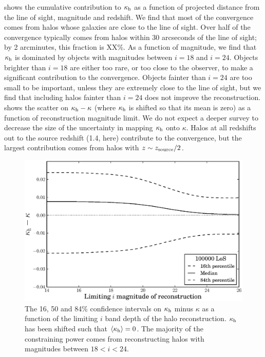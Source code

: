 \documentclass[useAMS,usenatbib]{mn2e}
\begin{document}
 shows the cumulative contribution to $\kappa_{\rm h}$ as a function
of projected distance from the line of sight, magnitude and redshift.
We find that most of the convergence comes from halos whose
galaxies are close to the line of sight. 
Over half of the  convergence
typically comes from halos within 30 arcseconds of the line of sight; by 2
arcminutes, this fraction is XX\%.  
As a function of magnitude, we find
that $\kappa_{\rm h}$ is dominated by objects with magnitudes between $i=18$ and
$i=24$. Objects brighter than $i=18$ are either too rare, or too close to the
observer, to make a significant contribution to the convergence. Objects
fainter than $i=24$ are too small to be important, unless they are extremely
close to the line of sight, but we find that including halos fainter than
$i=24$ does not improve the reconstruction.   shows the
scatter on $\kappa_{\rm h}-\kappa$ (where $\kappa_{\rm h}$ is shifted so that its mean is
zero) as a function of reconstruction magnitude limit. 
%
%
%
We do
not expect a deeper survey to decrease the size of the uncertainty in mapping
$\kappa_{\rm h}$ onto $\kappa$. Halos at all redshifts out to the source redshift
(1.4, here) contribute to the convergence, but the largest contribution comes from
halos with $z \sim z_{\rm source}/2$.

\begin{figure}
\includegraphics[width=\columnwidth]{figs/mag_scatter.eps}
\caption[magcut]{The 16, 50 and 84\% confidence intervals on $\kappa_{\rm h}$ minus
$\kappa$ as a function of the limiting $i$ band depth of the halo
reconstruction. $\kappa_{\rm h}$ has been shifted such that
$\left\langle\kappa_{\rm h}\right\rangle=0$. The majority of the constraining power
comes from reconstructing halos with magnitudes between $18<i<24$.}
\label{fig:magcut}
\end{figure}
\end{document}
